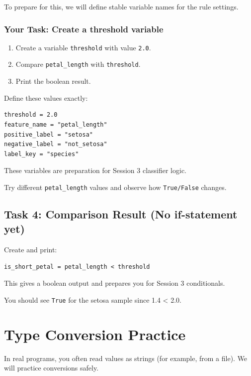 To prepare for this, we will define stable variable names for the rule settings.

\subsubsection{Your Task: Create a threshold variable}
\begin{enumerate}
    \item Create a variable \texttt{threshold} with value \texttt{2.0}.
    \item Compare \texttt{petal\_length} with \texttt{threshold}.
    \item Print the boolean result.
\end{enumerate}

Define these values exactly:
\begin{verbatim}
threshold = 2.0
feature_name = "petal_length"
positive_label = "setosa"
negative_label = "not_setosa"
label_key = "species"
\end{verbatim}

These variables are preparation for Session 3 classifier logic.

\noindent
Try different \texttt{petal\_length} values and observe how \texttt{True/False} changes.

\subsection{Task 4: Comparison Result (No if-statement yet)}
Create and print:
\begin{verbatim}
is_short_petal = petal_length < threshold
\end{verbatim}

This gives a boolean output and prepares you for Session 3 conditionals.

\begin{tcolorbox}[title=Checkpoint]
You should see \texttt{True} for the setosa sample since 1.4 < 2.0.
\end{tcolorbox}

\section{Type Conversion Practice}

In real programs, you often read values as strings (for example, from a file).
We will practice conversions safely.

